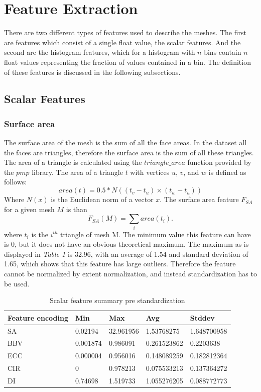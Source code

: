 \documentclass{bigdata}
\begin{document}
\section{Feature Extraction}

There are two different types of features used to describe the meshes. The first are features which consist of a single float value, the scalar features. And the second are the histogram features, which for a histogram with $n$ bins contain $n$ float values representing the fraction of values contained in a bin. The definition of these features is discussed in the following subsections.

\subsection{Scalar Features}

\subsubsection{Surface area}
The surface area of the mesh is the sum of all the face areas. In the dataset all the faces are triangles, therefore the surface area is the sum of all these triangles. The area of a triangle is calculated using the $triangle\_area$ function provided by the $pmp$ library. The area of a triangle $t$ with vertices $u$, $v$, and $w$ is defined as follows:
\begin{equation}
area(t) = 0.5 * N((t_v-t_u) \times (t_w-t_u))
\end{equation}
Where $N(x)$ is the Euclidean norm of a vector $x$. The surface area feature $F_{SA}$ for a given mesh $M$ is than
\begin{equation}
F_{SA}(M) = \sum\limits_{i} area(t_i).
\end{equation}
where $t_i$ is the $i^{th}$ triangle of mesh M. The minimum value this feature can have is 0, but it does not have an obvious theoretical maximum. The maximum as is displayed in \textit{Table 1} is 32.96, with an average of 1.54 and standard deviation of 1.65, which shows that this feature has large outliers. Therefore the feature cannot be normalized by extent normalization, and instead standardization has to be used. 

\begin{table}[h!]
\begin{center}
    \begin{tabular}{ l | l | l | l | l }
    \hline
    Feature encoding & Min & Max & Avg & Stddev \\ \hline
    SA & 0.02194 & 32.961956 & 1.53768275 & 1.648700958 \\ 
    BBV & 0.001874 & 0.986091 & 0.261523862 & 0.2203638 \\
    ECC & 0.000004 & 0.956016 & 0.148089259 & 0.182812364 \\ 
	CIR & 0 & 0.978213 & 0.075533213 & 0.137364272 \\ 
	DI & 0.74698 & 1.519733 & 1.055276205  & 0.088772773 	
    \end{tabular}
\end{center}
\caption{Scalar feature summary pre standardization}
\label{Table 1, }
\end{table}
\end{document}
